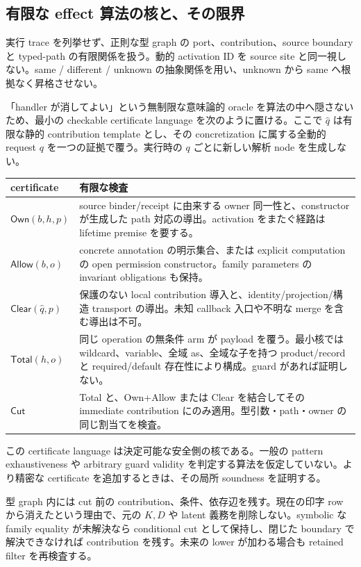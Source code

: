 \documentclass[11pt,a4paper]{article}
\theoremstyle{remark}
\begin{document}
\subsection{有限な effect 算法の核と、その限界}

実行 trace を列挙せず、正則な型 graph の port、contribution、source boundary と typed-path の有限関係を扱う。動的 activation ID を source site と同一視しない。same / different / unknown の抽象関係を用い、unknown から same へ根拠なく昇格させない。

「handler が消してよい」という無制限な意味論的 oracle を算法の中へ隠さないため、最小の checkable certificate language を次のように置ける。ここで $\widehat q$ は有限な静的 contribution template とし、その concretization に属する全動的 request $q$ を一つの証拠で覆う。実行時の $q$ ごとに新しい解析 node を生成しない。
\begin{longtable}{p{}p{}}
\toprule
certificate & 有限な検査 \\
\midrule\endhead
$\mathsf{Own}(b,h,p)$ & source binder/receipt に由来する owner 同一性と、constructor が生成した path 対応の導出。activation をまたぐ経路は lifetime premise を要する。\\
$\mathsf{Allow}(b,o)$ & concrete annotation の明示集合、または explicit computation の open permission constructor。family parameters の invariant obligations も保持。\\
$\mathsf{Clear}(\widehat q,p)$ & 保護のない local contribution 導入と、identity/projection/構造 transport の導出。未知 callback 入口や不明な merge を含む導出は不可。\\
$\mathsf{Total}(h,o)$ & 同じ operation の無条件 arm が payload を覆う。最小核では wildcard、variable、全域 as、全域な子を持つ product/record と required/default 存在性により構成。guard があれば証明しない。\\
$\mathsf{Cut}$ & Total と、Own+Allow または Clear を結合してその immediate contribution にのみ適用。型引数・path・owner の同じ割当てを検査。\\
\bottomrule
\end{longtable}
この certificate language は決定可能な安全側の核である。一般の pattern exhaustiveness や arbitrary guard validity を判定する算法を仮定していない。より精密な certificate を追加するときは、その局所 soundness を証明する。

型 graph 内には cut 前の contribution、条件、依存辺を残す。現在の印字 row から消えたという理由で、元の $K,D$ や latent 義務を削除しない。symbolic な family equality が未解決なら conditional cut として保持し、閉じた boundary で解決できなければ contribution を残す。未来の lower が加わる場合も retained filter を再検査する。
\end{document}
